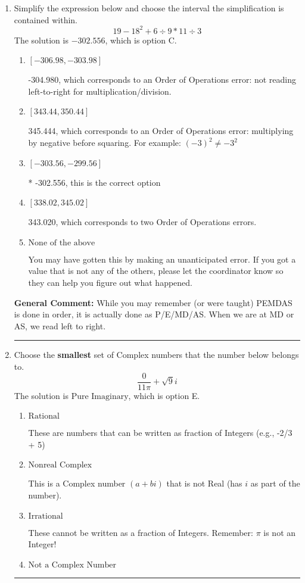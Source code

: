 \documentclass{extbook}[14pt]
\newcommand{\litem}[1]{\item #1

\rule{\textwidth}{0.4pt}}
\begin{document}
\begin{enumerate}\litem{
Simplify the expression below and choose the interval the simplification is contained within.
\[ 19 - 18^2 + 6 \div 9 * 11 \div 3 \]The solution is \( -302.556 \), which is option C.\begin{enumerate}[label=\Alph*.]
\item \( [-306.98, -303.98] \)

 -304.980, which corresponds to an Order of Operations error: not reading left-to-right for multiplication/division.
\item \( [343.44, 350.44] \)

 345.444, which corresponds to an Order of Operations error: multiplying by negative before squaring. For example: $(-3)^2 \neq -3^2$
\item \( [-303.56, -299.56] \)

* -302.556, this is the correct option
\item \( [338.02, 345.02] \)

 343.020, which corresponds to two Order of Operations errors.
\item \( \text{None of the above} \)

 You may have gotten this by making an unanticipated error. If you got a value that is not any of the others, please let the coordinator know so they can help you figure out what happened.
\end{enumerate}

\textbf{General Comment:} While you may remember (or were taught) PEMDAS is done in order, it is actually done as P/E/MD/AS. When we are at MD or AS, we read left to right.
}
\litem{
Choose the \textbf{smallest} set of Complex numbers that the number below belongs to.
\[ \frac{0}{11 \pi}+\sqrt{9}i \]The solution is \( \text{Pure Imaginary} \), which is option E.\begin{enumerate}[label=\Alph*.]
\item \( \text{Rational} \)

These are numbers that can be written as fraction of Integers (e.g., -2/3 + 5)
\item \( \text{Nonreal Complex} \)

This is a Complex number $(a+bi)$ that is not Real (has $i$ as part of the number).
\item \( \text{Irrational} \)

These cannot be written as a fraction of Integers. Remember: $\pi$ is not an Integer!
\item \( \text{Not a Complex Number} \)


\end{enumerate}}
\end{enumerate}
\end{document}
